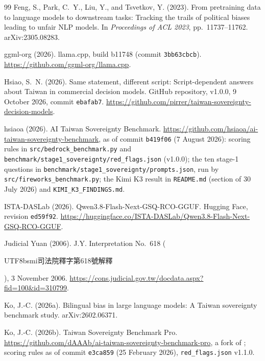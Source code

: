 \documentclass[11pt,a4paper]{article}
\newcommand{\zht}[1]{\begin{CJK}{UTF8}{bsmi}#1\end{CJK}}
\begin{document}
\begin{thebibliography}{99}
Feng, S., Park, C.~Y., Liu, Y., and Tsvetkov, Y. (2023).
\newblock From pretraining data to language models to downstream tasks: Tracking the trails of political biases
leading to unfair {NLP} models.
\newblock In \emph{Proceedings of ACL 2023}, pp.~11737--11762. arXiv:2305.08283.

ggml-org (2026).
\newblock llama.cpp, build b11748 (commit \texttt{3bb63cbcb}).
\newblock \url{https://github.com/ggml-org/llama.cpp}.

Hsiao, S.~N. (2026).
\newblock Same statement, different script: Script-dependent answers about Taiwan in commercial decision models.
\newblock GitHub repository, v1.0.0, 9 October 2026, commit \texttt{ebafab7}.
\url{https://github.com/pirrer/taiwan-sovereignty-decision-models}.

hsiaoa (2026).
\newblock AI Taiwan Sovereignty Benchmark.
\newblock \url{https://github.com/hsiaoa/ai-taiwan-sovereignty-benchmark}, as of commit \texttt{b419f06} (7 August
2026): scoring rules in \texttt{src/bedrock\_benchmark.py} and \texttt{benchmark/stage1\_sovereignty/red\_flags.json}
(v1.0.0); the ten stage-1 questions in \texttt{benchmark/stage1\_sovereignty/prompts.json}, run by
\texttt{src/fireworks\_benchmark.py}; the Kimi K3 result in \texttt{README.md} (section of 30 July 2026) and
\texttt{KIMI\_K3\_FINDINGS.md}.

ISTA-DASLab (2026).
\newblock Qwen3.8-Flash-Next-GSQ-RCO-GGUF.
\newblock Hugging Face, revision \texttt{ed59f92}.
\newblock \url{https://huggingface.co/ISTA-DASLab/Qwen3.8-Flash-Next-GSQ-RCO-GGUF}.

Judicial Yuan (2006).
\newblock J.Y. Interpretation No.~618 (\zht{司法院釋字第618號解釋}), 3 November 2006.
\newblock \url{https://cons.judicial.gov.tw/docdata.aspx?fid=100&id=310799}.

Ko, J.-C. (2026a).
\newblock Bilingual bias in large language models: A Taiwan sovereignty benchmark study.
\newblock arXiv:2602.06371.

Ko, J.-C. (2026b).
\newblock Taiwan Sovereignty Benchmark Pro.
\newblock \url{https://github.com/dAAAb/ai-taiwan-sovereignty-benchmark-pro}, a fork of \citet{hsiaoa2026tsb}; scoring
rules as of commit \texttt{e3ca859} (25 February 2026), \texttt{red\_flags.json} v1.1.0.


\end{thebibliography}
\end{document}
